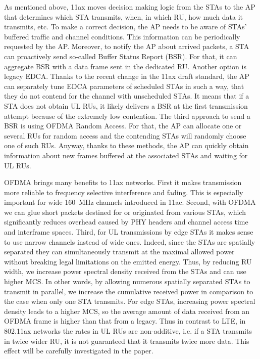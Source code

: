 As mentioned above, 11ax moves decision making logic from the STAs to the AP that determines which STA transmits, when, in which RU, how much data it transmits, etc.
To make a correct decision, the AP needs to be aware of STAs' buffered traffic and channel conditions.
This information can be periodically requested by the AP.
Moreover, to notify the AP about arrived packets, a STA can proactively send so-called Buffer Status Report (BSR).
For that, it can aggregate BSR with a data frame sent in the dedicated RU.
Another option is legacy EDCA.
Thanks to the recent change in the 11ax draft standard, the AP can separately tune EDCA parameters of scheduled STAs in such a way, that they do not contend for the channel with unscheduled STAs.
It means that if a STA does not obtain UL RUs, it likely delivers a BSR at the first transmission attempt because of the extremely low contention.
The third approach to send a BSR is using OFDMA Random Access.
For that, the AP can allocate one or several RUs for random access and the contending STAs will randomly choose one of such RUs. 
Anyway, thanks to these methods, the AP can quickly obtain information about new frames buffered  at the associated STAs and waiting for UL RUs.

OFDMA brings many benefits to 11ax networks.
First it makes transmission more reliable to frequency selective interference and fading.
This is especially important for wide \SI{160}{MHz} channels introduced in 11ac.
Second, with OFDMA we can glue short packets destined for or originated from various STAs, which significantly reduces overhead caused by PHY headers and channel access time and interframe spaces.
Third, for UL transmissions by edge STAs it makes sense to use narrow channels instead of wide ones.
Indeed, since the STAs are spatially separated they can simultaneously transmit at the maximal allowed power without breaking legal limitations on the emitted energy.
Thus, by reducing RU width, we increase power spectral density received from the STAs and can use higher MCS.
In other words, by allowing numerous spatially separated STAs to transmit in parallel, we increase the cumulative received power in comparison to the case when only one STA transmits.
For edge STAs, increasing power spectral density leads to a higher MCS, so  the average amount of data received from an OFDMA frame is higher than that from a legacy.
Thus in contrast to LTE, in 802.11ax networks the rates in UL RUs are non-additive, i.e. if a STA transmits in twice wider RU, it is not guaranteed that it transmits twice more data.
This effect will be carefully investigated in the paper.

